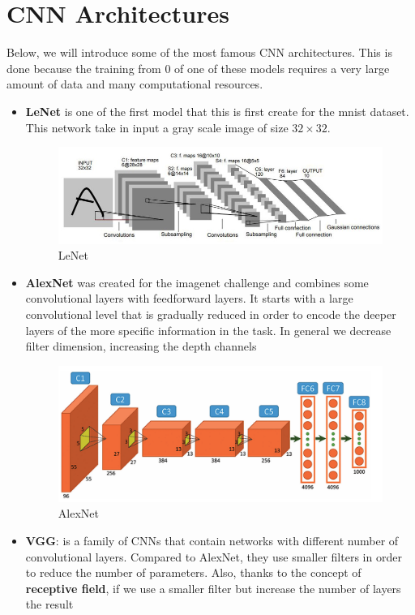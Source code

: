 \section{CNN Architectures}
Below, we will introduce some of the most famous CNN architectures. This is done because
the training from 0 of one of these models requires a very large amount of data and many
computational resources.
\begin{itemize}
    \item \textbf{LeNet} is one of the first model that this is first create for the mnist
          dataset. This network take in input a gray scale image of size $32 \times 32$.
          \begin{figure}[!ht]
              \centering
              \includegraphics[width=0.5\linewidth]{img/CNN/LeNet-5.jpeg}
              \caption{LeNet}
              \label{fig:lenet}
          \end{figure}
    \item \textbf{AlexNet} was created for the imagenet challenge and combines some
          convolutional layers with feedforward layers. It starts with a large convolutional
          level that is gradually reduced in order to encode the deeper layers of the more
          specific information in the task. In general we decrease filter dimension,
          increasing the depth channels
          \begin{figure}[!ht]
              \centering
              \includegraphics[width=0.5\linewidth]{img/CNN/alexNet.png}
              \caption{AlexNet}
              \label{fig:enter-label}
          \end{figure}
    \item \textbf{VGG}: is a family of CNNs that contain networks with different number of
          convolutional layers. Compared to AlexNet, they use smaller filters in order to
          reduce the number of parameters. Also, thanks to the concept of \textbf{receptive
              field}, if we use a smaller filter but increase the number of layers the result

\end{itemize}
